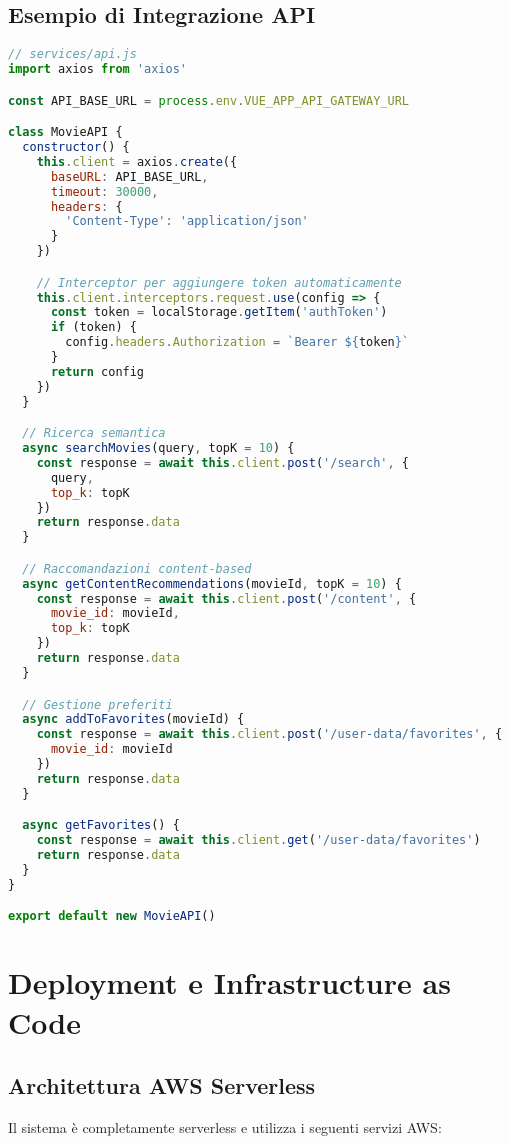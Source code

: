 \documentclass[11pt,a4paper]{article}
\begin{document}
\subsection{Esempio di Integrazione API}
\begin{lstlisting}[language=JavaScript, caption=Client API Integration]
// services/api.js
import axios from 'axios'

const API_BASE_URL = process.env.VUE_APP_API_GATEWAY_URL

class MovieAPI {
  constructor() {
    this.client = axios.create({
      baseURL: API_BASE_URL,
      timeout: 30000,
      headers: {
        'Content-Type': 'application/json'
      }
    })

    // Interceptor per aggiungere token automaticamente
    this.client.interceptors.request.use(config => {
      const token = localStorage.getItem('authToken')
      if (token) {
        config.headers.Authorization = `Bearer ${token}`
      }
      return config
    })
  }

  // Ricerca semantica
  async searchMovies(query, topK = 10) {
    const response = await this.client.post('/search', {
      query,
      top_k: topK
    })
    return response.data
  }

  // Raccomandazioni content-based
  async getContentRecommendations(movieId, topK = 10) {
    const response = await this.client.post('/content', {
      movie_id: movieId,
      top_k: topK
    })
    return response.data
  }

  // Gestione preferiti
  async addToFavorites(movieId) {
    const response = await this.client.post('/user-data/favorites', {
      movie_id: movieId
    })
    return response.data
  }

  async getFavorites() {
    const response = await this.client.get('/user-data/favorites')
    return response.data
  }
}

export default new MovieAPI()
\end{lstlisting}

\section{Deployment e Infrastructure as Code}

\subsection{Architettura AWS Serverless}
Il sistema è completamente serverless e utilizza i seguenti servizi AWS:
\end{document}
